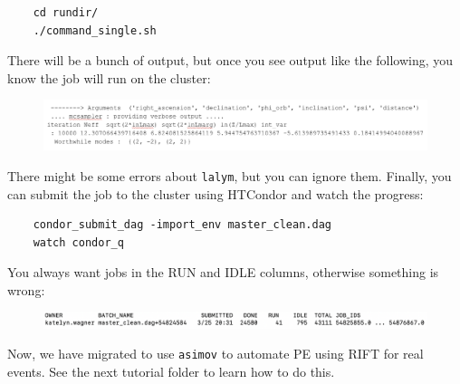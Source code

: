 \documentclass{article}
\begin{document}
\begin{verbatim}
    cd rundir/
    ./command_single.sh
\end{verbatim}
There will be a bunch of output, but once you see output like the following, you know the job will run on the cluster:
\begin{figure}[h!]
    \centering
    \includegraphics[width=0.9\linewidth]{output.png}
    \label{fig:output}
\end{figure}
There might be some errors about \texttt{lalym}, but you can ignore them. Finally, you can submit the job to the cluster using HTCondor and watch the progress:
\begin{verbatim}
    condor_submit_dag -import_env master_clean.dag
    watch condor_q
\end{verbatim}
You always want jobs in the RUN and IDLE columns, otherwise something is wrong:
\begin{figure}[h!]
    \centering
    \includegraphics[width=0.75\linewidth]{condor.png}
    \label{fig:condor}
\end{figure}

Now, we have migrated to use \texttt{asimov} to automate PE using RIFT for real events. See the next tutorial folder to learn how to do this.
\end{document}
